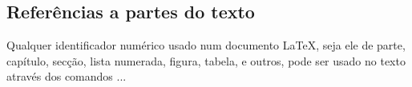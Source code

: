 \subsection{Referências a partes do texto}
\label{refs.Section}

Qualquer identificador numérico usado num documento {\LaTeX}, seja
ele de parte, capítulo, secção, lista numerada, figura, tabela, e
outros, pode ser usado no texto através dos comandos ...
